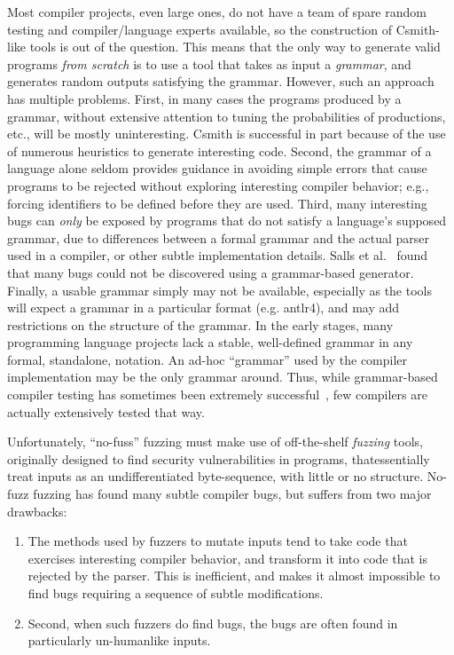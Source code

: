 \begin{sloppypar}
 Most compiler projects, even large ones, do not have a team
of spare random testing and compiler/language experts available, so the construction of
Csmith-like tools is out of the question.  This means that the only
way to generate valid programs \emph{from scratch} is to use a tool that takes as
input a \emph{grammar}, and generates random outputs
satisfying the grammar.   However, such an approach has multiple problems.
First, in many cases the programs produced by a grammar, without
extensive attention to tuning the probabilities of productions, etc., will be mostly uninteresting.
Csmith is successful in part because of the use of numerous heuristics
to generate interesting code.  Second, the grammar of a language alone
seldom provides guidance in avoiding simple errors that cause programs
to be rejected without exploring interesting compiler behavior; e.g., forcing identifiers to be
defined before they are used.  Third, many interesting bugs can \emph{only}
be exposed by programs that do not satisfy a language's supposed grammar, due to differences between a formal grammar and the actual
parser used in a compiler, or other subtle implementation details.
Salls et al.~\cite{Salls2021TokenLevel} found that many bugs could not be discovered using a
grammar-based generator.
Finally, a usable grammar simply may not be available, especially as the
tools will expect a grammar in a particular format (e.g. antlr4), and may add
restrictions on the structure of the grammar.  In the early stages,
many programming language projects lack a stable, well-defined
grammar in any formal, standalone, notation.  An ad-hoc ``grammar'' used by the compiler implementation may be the
only grammar around.  Thus, while grammar-based compiler
testing has sometimes been extremely successful~\cite{LangFuzz}, few compilers are actually
extensively tested that way.
\end{sloppypar}

Unfortunately, ``no-fuss''
fuzzing must make use of off-the-shelf \emph{fuzzing} tools,
originally designed to find security vulnerabilities in programs, thatessentially treat inputs as an
undifferentiated byte-sequence, with little or no structure.  No-fuzz
fuzzing has found many subtle compiler bugs, but
suffers from two major drawbacks:

\begin{enumerate}
\item The methods used by fuzzers to mutate inputs tend to take code that exercises interesting
  compiler behavior, and transform it into code that is rejected by
  the parser.  This is inefficient, and makes it
  almost impossible to find bugs requiring a sequence of subtle
  modifications.
  \item Second, when such fuzzers do find bugs, the bugs are often
    found in particularly un-humanlike inputs.
  \end{enumerate}

